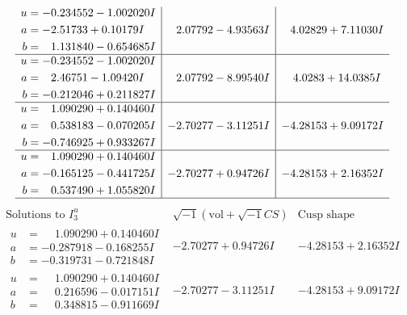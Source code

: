 \documentclass[1p]{elsarticle_modified}
\theoremstyle{definition}
\newcommand{\I}{\sqrt{-1}}
\begin{document}
$$\begin{array}{c|c|c}
\begin{aligned}
u &= -0.234552 - 1.002020 I \\
a &= -2.51733 + 0.10179 I \\
b &= \phantom{-}1.131840 - 0.654685 I\end{aligned}
 & \phantom{-}2.07792 - 4.93563 I & \phantom{-}4.02829 + 7.11030 I \\ \hline\begin{aligned}
u &= -0.234552 - 1.002020 I \\
a &= \phantom{-}2.46751 - 1.09420 I \\
b &= -0.212046 + 0.211827 I\end{aligned}
 & \phantom{-}2.07792 - 8.99540 I & \phantom{-}4.0283 + 14.0385 I \\ \hline\begin{aligned}
u &= \phantom{-}1.090290 + 0.140460 I \\
a &= \phantom{-}0.538183 - 0.070205 I \\
b &= -0.746925 + 0.933267 I\end{aligned}
 & -2.70277 - 3.11251 I & -4.28153 + 9.09172 I \\ \hline\begin{aligned}
u &= \phantom{-}1.090290 + 0.140460 I \\
a &= -0.165125 - 0.441725 I \\
b &= \phantom{-}0.537490 + 1.055820 I\end{aligned}
 & -2.70277 + 0.94726 I & -4.28153 + 2.16352 I\\
 \hline 
 \end{array}$$\newpage$$\begin{array}{c|c|c}  
\text{Solutions to }I^u_{3}& \I (\text{vol} + \sqrt{-1}CS) & \text{Cusp shape}\\
 \hline 
\begin{aligned}
u &= \phantom{-}1.090290 + 0.140460 I \\
a &= -0.287918 - 0.168255 I \\
b &= -0.319731 - 0.721848 I\end{aligned}
 & -2.70277 + 0.94726 I & -4.28153 + 2.16352 I \\ \hline\begin{aligned}
u &= \phantom{-}1.090290 + 0.140460 I \\
a &= \phantom{-}0.216596 - 0.017151 I \\
b &= \phantom{-}0.348815 - 0.911669 I\end{aligned}
 & -2.70277 - 3.11251 I & -4.28153 + 9.09172 I \\ \hline\begin{aligned}

\end{aligned}
\end{array}$$
\end{document}
